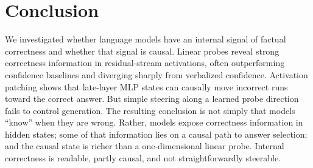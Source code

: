 \documentclass[11pt]{article}
\begin{document}
\section{Conclusion}

We investigated whether language models have an internal signal of factual
correctness and whether that signal is causal. Linear probes reveal strong
correctness information in residual-stream activations, often outperforming
confidence baselines and diverging sharply from verbalized confidence. Activation
patching shows that late-layer MLP states can causally move incorrect runs toward
the correct answer. But simple steering along a learned probe direction fails to
control generation. The resulting conclusion is not simply that models ``know''
when they are wrong. Rather, models expose correctness information in hidden
states; some of that information lies on a causal path to answer selection; and
the causal state is richer than a one-dimensional linear probe. Internal
correctness is readable, partly causal, and not straightforwardly steerable.


\end{document}
